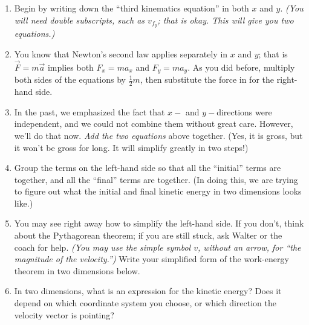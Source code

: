 \documentclass[12pt]{article}
\begin{document}
\begin{enumerate}
\item Begin by writing down the ``third kinematics equation'' in both $x$ and $y$. {\it (You will need double subscripts, such as $v_{f_y}$; that is okay. This will give you two equations.)}

\vspace{2in}

\item You know that Newton's second law applies separately in $x$ and $y$; that is $\vec F = m \vec a$ implies both $F_x = m a_x$ and $F_y = m a_y$. As you did before, multiply both sides of the equations by $\frac {1}{2}m$, then substitute the force in for the right-hand side.

\vspace{2in}

\item In the past, we emphasized the fact that $x-$ and $y-$directions were independent, and we could not combine them without great care. However, we'll do that now. {\it Add the two equations} above together. (Yes, it is gross, but it won't be gross for long. It will simplify greatly in two steps!)
\vspace{1in}
\newpage

\item Group the terms on the left-hand side so that all the ``initial'' terms are together, and all the ``final'' terms are together. (In doing this, we are trying to figure out what the initial and final kinetic energy in two dimensions looks like.)

\vspace{2in}

\item You may see right away how to simplify the left-hand side. If you don't, think about the Pythagorean theorem; if you are still stuck, ask Walter or the coach for help. {\it (You may use the simple symbol $v$, without an arrow, for ``the magnitude of the velocity.'')} Write your simplified form of the work-energy theorem in two dimensions below. 

\vspace{2in}

\item In two dimensions, what is an expression for the kinetic energy? Does it depend on which coordinate system you choose, or which direction the velocity vector is pointing?

\vspace{2in}
\newpage


\end{enumerate}
\end{document}
